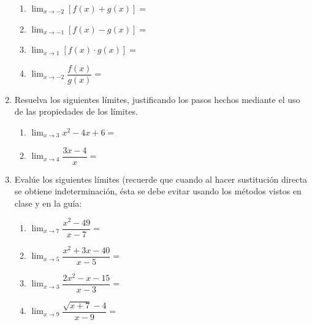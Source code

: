 \documentclass[letterpaper,fleqn]{article}
\let\ds\displaystyle
\begin{document}
\begin{enumerate}
\begin{enumerate}
\item $\ds{\lim_{x\rightarrow -2}[f(x)+g(x)]}=$
\item $\ds{\lim_{x\rightarrow -1}[f(x)-g(x)]=}$
\item $\ds{\lim_{x\rightarrow 1}[f(x)\cdot g(x)]}=$
\item $\ds{\lim_{x\rightarrow -2}\dfrac{f(x)}{g(x)}}=$
\end{enumerate}
	\item Resuelva los siguientes límites, justificando los pasos hechos mediante el uso de las propiedades de los límites.
	\begin{enumerate}
	\item $\ds{\lim_{x\rightarrow 3}x^{2}-4x+6}=$\noanswer
	\item $\ds{\lim_{x\rightarrow 4}\dfrac{3x-4}{x}}=$\vspace*{20pt}
	\end{enumerate}
   \item Evalúe los siguientes límites (recuerde que cuando al hacer sustitución directa se obtiene indeterminación, ésta se debe evitar usando los métodos vistos en clase y en la guía:
   \begin{enumerate}
   \item $\ds{\lim_{x\rightarrow 7}\dfrac{x^{2}-49}{x-7}}=$\noanswer
   \item $\ds{\lim_{x\rightarrow 5}\dfrac{x^{2}+3x-40}{x-5}}=$\noanswer
   \item $\ds{\lim_{x\rightarrow 3}\dfrac{2x^{2}-x-15}{x-3}}=$\noanswer
   \item $\ds{\lim_{x\rightarrow 9}\dfrac{\sqrt{x+7}-4}{x-9}}=$\noanswer
   \end{enumerate}
 \end{enumerate}
\end{document}
